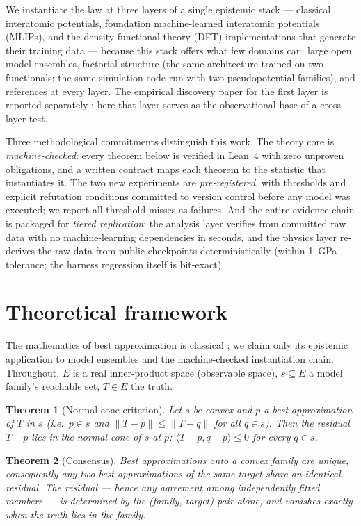\documentclass[11pt]{article}
\newtheorem{theorem}{Theorem}
\theoremstyle{remark}
\newcommand{\inn}[2]{\langle #1, #2 \rangle}
\begin{document}
We instantiate the law at three layers of a single epistemic stack ---
classical interatomic potentials, foundation machine-learned interatomic
potentials (MLIPs), and the density-functional-theory (DFT) implementations
that generate their training data --- because this stack offers what few
domains can: large open model ensembles, factorial structure (the same
architecture trained on two functionals; the same simulation code run with two
pseudopotential families), and references at every layer. The empirical
discovery paper for the first layer is reported separately
\citep{welcing2026instance}; here that layer serves as the observational base
of a cross-layer test.

Three methodological commitments distinguish this work. The theory core is
\emph{machine-checked}: every theorem below is verified in Lean~4 with zero
unproven obligations, and a written contract maps each theorem to the
statistic that instantiates it. The two new experiments are
\emph{pre-registered}, with thresholds and explicit refutation conditions
committed to version control before any model was executed; we report all
threshold misses as failures. And the entire evidence chain is packaged for
\emph{tiered replication}: the analysis layer verifies from committed raw data
with no machine-learning dependencies in seconds, and the physics layer
re-derives the raw data from public checkpoints deterministically (within
1~GPa tolerance; the harness regression itself is bit-exact).

\section{Theoretical framework}
\label{sec:theory}

The mathematics of best approximation is classical
\citep{deutsch2001,kinderlehrer1980}; we claim only its epistemic application
to model ensembles and the machine-checked instantiation chain. Throughout,
$E$ is a real inner-product space (observable space), $s \subseteq E$ a model
family's reachable set, $T \in E$ the truth.

\begin{theorem}[Normal-cone criterion]\label{thm:cone}
Let $s$ be convex and $p$ a best approximation of $T$ in $s$
(i.e.\ $p \in s$ and $\|T-p\| \le \|T-q\|$ for all $q \in s$). Then the
residual $T - p$ lies in the normal cone of $s$ at $p$:
$\inn{T-p}{q-p} \le 0$ for every $q \in s$.
\end{theorem}

\begin{theorem}[Consensus]\label{thm:consensus}
Best approximations onto a convex family are unique; consequently any two best
approximations of the same target share an \emph{identical} residual. The
residual --- hence any agreement among independently fitted members --- is
determined by the (family, target) pair alone, and vanishes exactly when the
truth lies in the family.
\end{theorem}
\end{document}
